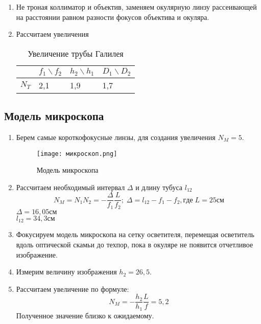 \documentclass[12pt,a4paper]{article}
\begin{document}
\begin{enumerate}
    \item Не троная коллиматор и объектив, заменяем окулярную линзу рассеивающей на расстоянии равном разности фокусов объектива и окуляра.
    \item Рассчитаем увеличения
    
    \begin{table}[H]
        \centering
        \begin{center}
        \end{center}
        \vspace{0.1cm}
        \label{tab:my_label}
        \begin{tabular}{ |p{2cm}|p{2cm}|p{2cm}|p{2cm}|}
     \hline
      & $f_1 \backslash f_2$ & $h_2\backslash h_1$ & $D_1\backslash D_2$ \\
     \hline
     $N_T$ & 2,1 & 1,9 & 1,7 \\
    \hline
    \end{tabular}
    \caption{Увеличение трубы Галилея}
    \end{table}

\end{enumerate}

\subsection{Модель микроскопа}

\begin{enumerate}
    \item Берем самые короткофокусные линзы, для создания увеличения $N_M = 5$.
    \begin{figure}[H]
        \begin{center}
        \texttt{[image: микроскоп.png]}
        \caption{ Модель микроскопа}
        \label{micros} %
        \end{center}
    \end{figure}
    \item Рассчитаем необходимый интервал $\varDelta$ и длину тубуса $l_{12}$
    \begin{equation}
       N_M = N_1N_2 = -\frac{\varDelta}{f_1}\frac{L}{f_2}; \; \varDelta = l_{12} - f_1 - f_2, где \; L= 25см
    \end{equation}
    $\varDelta = 16,05 см$
    \\
    $l_{12} = 34,3 см$
    \item Фокусируем модель микроскопа на сетку осветителя, перемещая осветитель вдоль оптической скамьи до техпор, пока в окуляре не появится отчетливое изображение.
    \item Измерим величину изображения $h_2 = 26,5$.
    \item Рассчитаем увеличение по формуле:
    \begin{equation}
        N_M = - \frac{h_2}{h_1}\frac{L}{f} = 5,2 
    \end{equation}
    Полученное значение близко к ожидаемому.
\end{enumerate}
\end{document}
